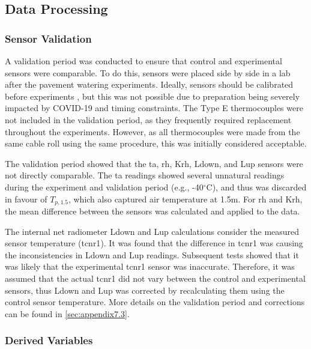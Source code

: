 \documentclass[final,3p,times,authoryear]{elsarticle}
\begin{document}
\subsection{Data Processing}\label{sec:methods2.2}
\subsubsection{Sensor Validation}\label{sec:methods2.2.1}

A validation period was conducted to ensure that control and experimental sensors were
comparable. To do this, sensors were placed side by side in a lab after the pavement
watering experiments. Ideally, sensors should be calibrated before experiments \citep{Phillips2001}, but this was not possible due to preparation being severely impacted by COVID-19 and timing constraints. The Type E thermocouples
were not included in the validation period, as they frequently required replacement
throughout the experiments. However, as all thermocouples were made from the same
cable roll using the same procedure, this was initially considered acceptable.

The validation period showed that the \gls{ta}, \gls{rh}, \gls{Krh}, \gls{Ldown}, and \gls{Lup} sensors were not directly comparable. The \gls{ta} readings showed several unnatural readings during the experiment and validation period (e.g., -40$^{\circ}$C), and thus was discarded in favour of $T_{p,1.5}$, which also captured air temperature at 1.5m. For \gls{rh} and \gls{Krh}, the mean difference between the sensors was calculated and applied to the data. 

The internal net radiometer \gls{Ldown} and \gls{Lup} calculations consider the measured sensor temperature (\gls{tcnr1}). It was found that the difference in \gls{tcnr1} was causing the inconsistencies in \gls{Ldown} and \gls{Lup} readings. Subsequent tests showed that it was likely that the experimental \gls{tcnr1} sensor was inaccurate. Therefore, it was assumed that the actual \gls{tcnr1} did not vary between the control and experimental sensors, thus \gls{Ldown} and \gls{Lup} was corrected by recalculating them using the control sensor temperature. More details on the validation period and corrections can be found in \ref{sec:appendix7.3}.

\subsubsection{Derived Variables}\label{sec:methods2.2.2}
\end{document}
